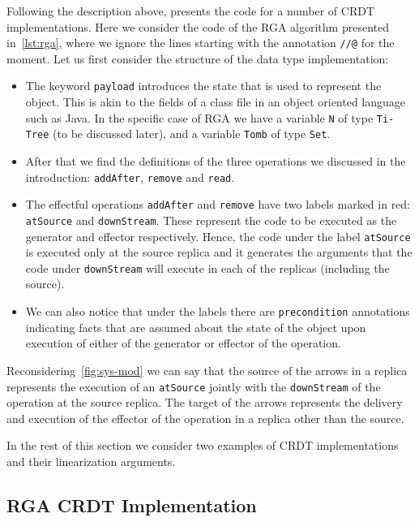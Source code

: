 Following the description above, \citet{ShapiroPBZ11} presents the code
for a number of CRDT implementations.
%
Here we consider the code of the RGA algorithm presented
in~\autoref{lst:rga}, where we ignore the lines starting with the
annotation \lstinline|//@| for the moment.
%
Let us first consider the structure of the data type implementation:
\begin{itemize}
\item The keyword \lstinline|payload| introduces the state that is
  used to represent the object. This is akin to the fields of a class
  file in an object oriented language such as Java. In the specific
  case of RGA we have a variable \lstinline|N| of type
  \lstinline|Ti-Tree| (to be discussed later), and a variable
  \lstinline|Tomb| of type \lstinline|Set|.
\item After that we find the definitions of the three operations we
  discussed in the introduction: \lstinline|addAfter|,
  \lstinline|remove| and \lstinline|read|.
\item The effectful operations \lstinline|addAfter| and
  \lstinline|remove| have two labels marked in red:
  \lstinline|atSource| and \lstinline|downStream|.
  These represent the code to be executed as the generator and
  effector respectively. Hence, the code under the label
  \lstinline|atSource| is executed only at the source replica and it
  generates the arguments that the code under \lstinline|downStream|
  will execute in each of the replicas (including the source).
\item We can also notice that under the labels there are
  \lstinline|precondition| annotations indicating facts that are
  assumed about the state of the object upon execution of either of
  the generator or effector of the operation.
\end{itemize}
Reconsidering~\autoref{fig:sys-mod} we can say that the
source of the arrows in a replica represents the execution of an
\lstinline|atSource| jointly with the \lstinline|downStream| of the
operation at the source replica.
%
The target of the arrows represents the delivery and execution of the
effector of the operation in a replica other than the source.


In the rest of this section we consider two examples of CRDT
implementations and their linearization arguments.

\subsection{RGA CRDT Implementation}
\label{sec:rga-crdt-impl}

